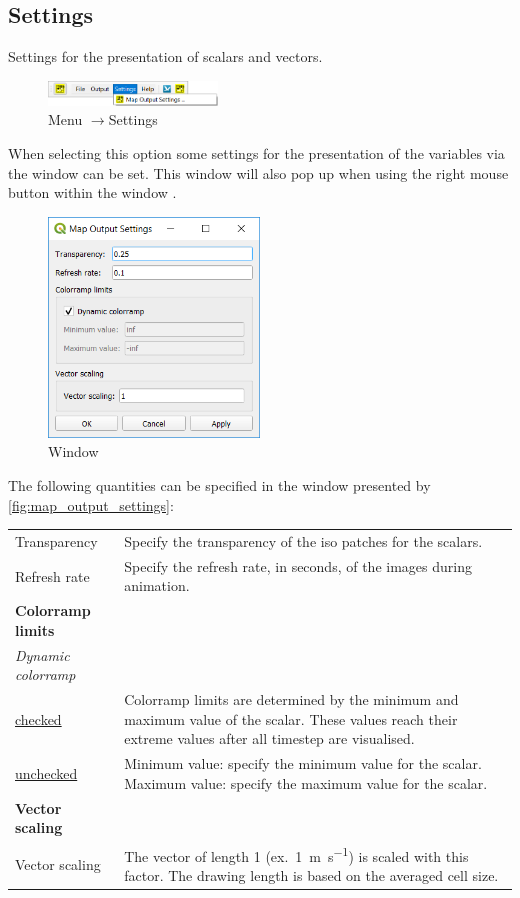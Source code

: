 \documentclass{deltares_memo}
\newcommand{\menuarrow}{$\rightarrow$}
\begin{document}
\subsection{Settings}
Settings for the presentation of scalars and vectors.
\begin{figure}[H]
    \centering    
    \includegraphics[width=0.40\textwidth]{pictures/menu_settings.png}
    \caption{Menu \menuarrow Settings}
\end{figure}
When selecting this option some settings for the presentation of the variables via the window  can be set. 
This window will also pop up when using the right mouse button within the window .
\begin{figure}[H]
	\centering    
	\includegraphics[width=0.50\textwidth]{pictures/map_properties.png}
	\caption{Window \label{fig:map_output_settings}}
\end{figure}
The following quantities can be specified in the window presented by \autoref{fig:map_output_settings}:
\begin{longtable}{p{35mm-12pt} p{\textwidth-35mm-12pt}} 
	Transparency & Specify the transparency of the iso patches for the scalars. \\
	Refresh rate & Specify the refresh rate, in seconds, of the images during animation. \\	
	\textbf{Colorramp limits} & \\
	\textsl{Dynamic colorramp} & \\
	\underline{checked} & Colorramp limits are determined by the minimum and maximum value of the scalar. 
	These values reach their extreme values after all timestep are visualised.\\
	\underline{unchecked} & 
	Minimum value: \quad specify the minimum value for the scalar.\newline
	Maximum value: \quad specify the maximum value for the scalar.\\
	\textbf{Vector scaling} & \\
	Vector scaling & The vector of length 1 (ex.\ \SI{1}{\metre\per\second}) is scaled with this factor. The drawing length is based on the averaged cell size.
\end{longtable}
\end{document}
